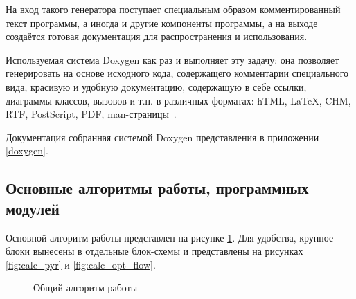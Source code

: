 На вход такого генератора поступает специальным образом комментированный текст программы, а иногда и другие компоненты программы, а на выходе создаётся готовая документация для распространения и использования.

Используемая система Doxygen как раз и выполняет эту задачу: она позволяет генерировать на основе исходного кода, содержащего комментарии специального вида, красивую и удобную документацию, содержащую в себе ссылки, диаграммы классов, вызовов и т.п. в различных форматах: hTML, LaTeX, CHM, RTF, PostScript, PDF, man-страницы~\cite{doxygen}.

Документация собранная системой Doxygen представления в приложении \ref{doxygen}.
\subsection{Основные алгоритмы работы, программных модулей}
Основной алгоритм работы представлен на рисунке \ref{fig:lucas_kanade_alg}. Для удобства, крупное блоки вынесены в отдельные блок-схемы и представлены на рисунках \ref{fig:calc_pyr} и \ref{fig:calc_opt_flow}.
\begin{figure}[h!]
\caption{Общий алгоритм работы}
\label{fig:lucas_kanade_alg}
\end{figure}
